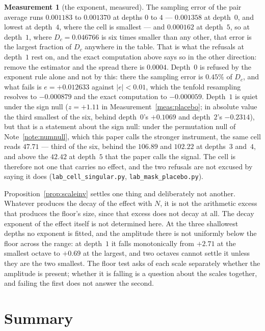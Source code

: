 \documentclass[11pt,a4paper]{article}
\theoremstyle{plain}
\theoremstyle{definition}
\newtheorem{measurement}[theorem]{Measurement}
\theoremstyle{remark}
\begin{document}
\begin{measurement}[the exponent, measured]
The sampling error of the pair average runs $0.001183$ to $0.001370$
at depths $0$ to $4$ --- $0.001358$ at depth~$0$, and lowest at
depth~$4$, where the cell is smallest --- and $0.000162$ at
depth~$5$, so at depth~$1$, where
$D_c=0.046766$ is six times smaller than any other, that error is the
largest fraction of $D_c$ anywhere in the table. That is what the
refusals at depth~$1$ rest on, and the exact computation above says so
in the other direction: remove the estimator and the spread there is
$0.0004$. Depth~$0$ is refused by the exponent rule alone and not by
this: there the sampling error is $0.45\%$ of $D_c$, and what fails is
$e=+0.012633$ against $|e|<0.01$, which the tenfold resampling
resolves to $-0.000879$ and the exact computation to $-0.000059$.
Depth~$1$ is quiet under
the sign null ($z=+1.11$ in Measurement~\ref{meas:placebo}; in
absolute value the third smallest of the six, behind depth~$0$'s
$+0.1069$ and depth~$2$'s $-0.2314$), but that is a
statement about the sign null: under the permutation null of
Note~\ref{note:numnull}, which this paper calls the stronger
instrument, the same cell reads $47.71$ --- third of the six, behind
the $106.89$ and $102.22$ at depths~$3$ and~$4$, and above the $42.42$
at depth~$5$ that the paper calls the signal. The cell is therefore not one that
carries no effect, and the two refusals are not excused by saying
it does (\texttt{lab\_cell\_singular.py},
\texttt{lab\_mask\_placebo.py}).
\end{measurement}

Proposition~\ref{prop:scaleinv} settles one thing and deliberately not
another. Whatever produces the decay of the effect with $N$, it is not
the arithmetic excess that produces the floor's size, since that
excess does not decay at all. The decay exponent of the effect itself
is not determined here. At the three shallowest depths no exponent is
fitted, and the amplitude there is not uniformly below the floor
across the range: at depth~$1$ it falls monotonically from $+2.71$ at
the smallest octave to $+0.69$ at the largest, and two octaves cannot
settle it unless they are the two smallest. The floor test asks of each scale separately whether
the amplitude is present; whether it is falling is a question about
the scales together, and failing the first does not answer the
second.

\section{Summary}
\end{document}

